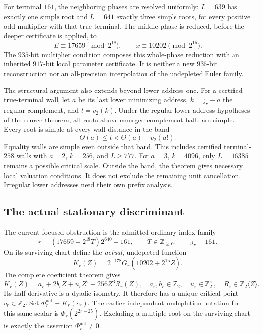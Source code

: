 For terminal $161$, the neighboring phases are resolved uniformly:
$L=639$ has exactly one simple root and $L=641$ exactly three simple
roots, for every positive odd multiplier with that true terminal.
The middle phase is reduced, before the deeper certificate is applied,
to
\[
 B\equiv17659\pmod{2^{18}},\qquad
 x\equiv10202\pmod{2^{15}}.
\]
The $935$-bit multiplier condition composes this whole-phase reduction
with an inherited $917$-bit local parameter certificate. It is neither
a new $935$-bit reconstruction nor an all-precision interpolation of
the undepleted Euler family.

The structural argument also extends beyond lower address one.
For a certified true-terminal wall, let $a$ be its last lower minimizing
address, $k=j_r-a$ the regular complement, and $t=v_2(k)$.
Under the regular lower-address hypotheses of the source theorem,
all roots above emerged complement balls are simple. Every root is
simple at every wall distance in the band
\[
 \Theta(a)\le t<\Theta(a)+v_2(a!).
\]
Equality walls are simple even outside that band. This includes
certified terminal-$258$ walls with $a=2$, $k=256$, and $L\ge777$.
For $a=3$, $k=4096$, only $L=16385$ remains a possible critical scale.
Outside the band, the theorem gives necessary local valuation conditions.
It does not exclude the remaining unit cancellation. Irregular lower
addresses need their own prefix analysis.

\subsection{The actual stationary discriminant}
\label{app:root:stationary}

The current focused obstruction is the admitted ordinary-index family
\begin{equation}
 r=(17659+2^{18}T)2^{640}-161,
 \qquad T\in\mathbb Z_{\ge0},\qquad j_r=161.
 \label{eq:root:focusedfamily}
\end{equation}
On its surviving chart define the \emph{actual}, undepleted function
\[
 K_r(Z)=2^{-178}G_r(10202+2^{15}Z).
\]
The complete coefficient theorem gives
\begin{equation}
 K_r(Z)=a_r+2b_rZ+u_rZ^2+256Z^3R_r(Z),
 \quad a_r,b_r\in\mathbb Z_2,\quad
 u_r\in\mathbb Z_2^\times,\quad
 R_r\in\mathbb Z_2\langle Z\rangle.
 \label{eq:root:quadraticclass}
\end{equation}
Its half derivative is a dyadic isometry. It therefore has a unique
critical point $c_r\in\mathbb Z_2$. Set
$\Phi_r^{\mathrm{act}}=K_r(c_r)$.
The earlier independent-undepletion notation for this same scalar is
$\Phi_r(2^{2r-25})$.
Excluding a multiple root on the surviving chart is exactly the assertion
$\Phi_r^{\mathrm{act}}\ne0$.

